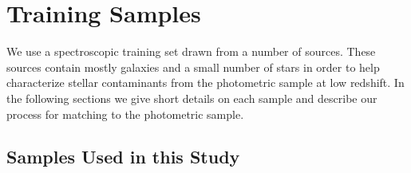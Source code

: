 \documentclass[preprint]{aastex}
\begin{document}
\section{Training Samples} \label{sec:train}

We use a spectroscopic training set drawn from a number of sources. These
sources contain mostly galaxies and a small number of stars in order to help
characterize stellar contaminants from the photometric sample at low redshift.
In the following sections we give short details on each sample and describe our
process for matching to the photometric sample.

\subsection{Samples Used in this Study} \label{sec:train:def}
\end{document}
